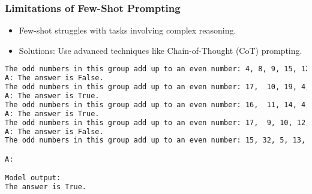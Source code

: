 

\begin{frame}[fragile]\frametitle{Limitations of Few-Shot Prompting}
    \begin{itemize}
        \item Few-shot struggles with tasks involving complex reasoning.
        \item Solutions: Use advanced techniques like Chain-of-Thought (CoT) prompting.
    \end{itemize}
	
        \begin{lstlisting}[language=HTML]
The odd numbers in this group add up to an even number: 4, 8, 9, 15, 12, 2, 1.
A: The answer is False.
The odd numbers in this group add up to an even number: 17,  10, 19, 4, 8, 12, 24.
A: The answer is True.
The odd numbers in this group add up to an even number: 16,  11, 14, 4, 8, 13, 24.
A: The answer is True.
The odd numbers in this group add up to an even number: 17,  9, 10, 12, 13, 4, 2.
A: The answer is False.
The odd numbers in this group add up to an even number: 15, 32, 5, 13, 82, 7, 1. 

A:

Model output:
The answer is True.
\end{lstlisting}

\end{frame}


